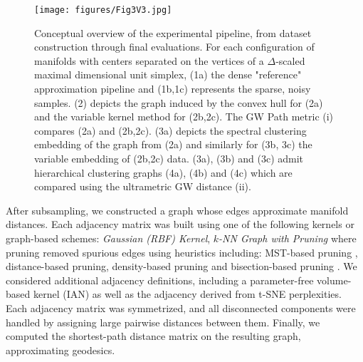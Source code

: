 \documentclass{article}
\theoremstyle{plain}
\theoremstyle{definition}
\theoremstyle{remark}
\begin{document}

\begin{figure}[t]
\centering
\texttt{[image: figures/Fig3V3.jpg]}
\caption{Conceptual overview of the experimental pipeline, from dataset construction through final evaluations. For each configuration of manifolds with centers separated on the vertices of a $\Delta$-scaled maximal dimensional unit simplex, (1a) the dense "reference" approximation pipeline and (1b,1c) represents the sparse, noisy samples. (2) depicts the graph induced by the convex hull for (2a) and the variable kernel method for (2b,2c). The GW Path metric (i) compares (2a) and (2b,2c). (3a) depicts the spectral clustering embedding of the graph from (2a) and similarly for (3b, 3c) the variable embedding of (2b,2c) data. (3a), (3b) and (3c) admit hierarchical clustering graphs (4a), (4b) and (4c) which are compared using the ultrametric GW distance (ii).}
\label{fig:pipeline-experiment}
\end{figure}

After subsampling, we constructed a graph whose edges approximate manifold distances. Each adjacency matrix was built using one of the following kernels or graph-based schemes:
\textit{Gaussian (RBF) Kernel},
\textit{$k$-NN Graph with Pruning}
where pruning removed spurious edges using heuristics including:
MST-based pruning \cite{MSTShaoChaoZhao2007}, 
distance-based pruning, 
density-based pruning and bisection-based pruning \cite{TianLiZhangBisection}. 
We considered additional adjacency definitions, including a parameter-free volume-based kernel (IAN) as well as the adjacency derived from t-SNE perplexities. \cite{dyballaIANIteratedAdaptive2023a} Each adjacency matrix was symmetrized, and all disconnected components were handled by assigning large pairwise distances between them. Finally, we computed the shortest-path distance matrix on the resulting graph, approximating geodesics.
\end{document}
